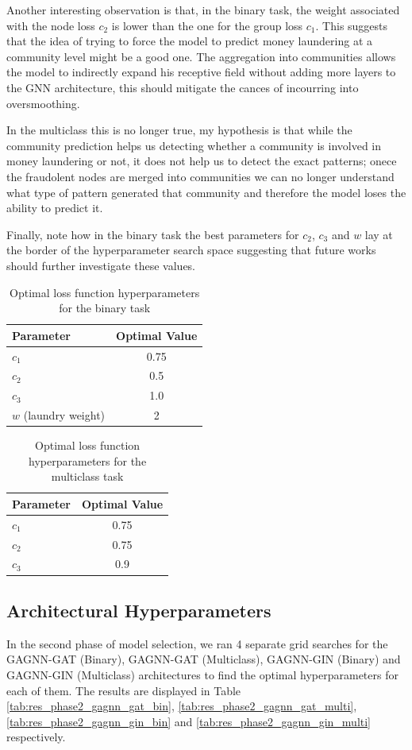 Another interesting observation is that, in the binary task, the weight associated with the node loss \(c_2\) is lower than the one for the group loss \(c_1\). This suggests that the idea of trying to force the model to predict money laundering at a community level might be a good one. The aggregation into communities allows the model to indirectly expand his receptive field without adding more layers to the GNN architecture, this should mitigate the cances of incourring into oversmoothing.

In the multiclass this is no longer true, my hypothesis is that while the community prediction helps us detecting whether a community is involved in money laundering or not, it does not help us to detect the exact patterns; onece the fraudolent nodes are merged into communities we can no longer understand what type of pattern generated that community and therefore the model loses the ability to predict it.

Finally, note how in the binary task the best parameters for \(c_2\), \(c_3\) and \(w\) lay at the border of the hyperparameter search space suggesting that future works should further investigate these values.
\begin{table}
\centering
\begin{tabular}{l c}
\hline
\textbf{Parameter} & \textbf{Optimal Value} \\
\hline
$c_1$ &  0.75\\
$c_2$ &  0.5\\
$c_3$ &  1.0\\
$w$ (laundry weight) &  2\\
\hline
\end{tabular}
\caption{Optimal loss function hyperparameters for the binary task}
\label{tab:res_phase1_binary}
\end{table}

\begin{table}[h]
\centering
\begin{tabular}{l c}
\hline
\textbf{Parameter} & \textbf{Optimal Value} \\
\hline
$c_1$ & 0.75 \\
$c_2$ & 0.75\\
$c_3$ & 0.9 \\
\hline
\end{tabular}
\caption{Optimal loss function hyperparameters for the multiclass task}
\label{tab:res_phase1_multi}
\end{table}

\subsection{Architectural Hyperparameters}\label{archres}
In the second phase of model selection, we ran 4 separate grid searches for the GAGNN-GAT (Binary), GAGNN-GAT (Multiclass), GAGNN-GIN (Binary) and GAGNN-GIN (Multiclass) architectures to find the optimal hyperparameters for each of them. The results are displayed in Table \ref{tab:res_phase2_gagnn_gat_bin}, \ref{tab:res_phase2_gagnn_gat_multi}, \ref{tab:res_phase2_gagnn_gin_bin} and \ref{tab:res_phase2_gagnn_gin_multi} respectively.

